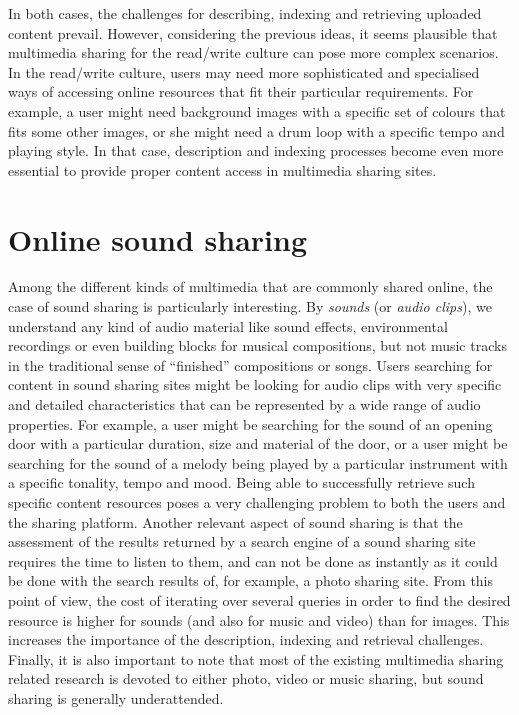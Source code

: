 In both cases, the challenges for describing, indexing and retrieving uploaded content prevail. 
However, considering the previous ideas, it seems plausible that multimedia sharing for the read/write culture can pose more complex scenarios. In the read/write culture, users may need more sophisticated and specialised ways of accessing online resources that fit their particular requirements. For example, a user might need background images with a specific set of colours that fits some other images, or she might need a drum loop with a specific tempo and playing style. In that case, description and indexing processes become even more essential to provide proper content access in multimedia sharing sites.

\section{Online sound sharing}
\label{sec:intro:sound_sharing}

Among the different kinds of multimedia that are commonly shared online, the case of sound sharing is particularly interesting. By \emph{sounds} (or \emph{audio clips}), we understand any kind of audio material like sound effects, environmental recordings or even building blocks for musical compositions, but not music tracks in the traditional sense of ``finished'' compositions or songs.
Users searching for content in sound sharing sites might be looking for audio clips with very specific and detailed characteristics that can be represented by a wide range of audio properties. For example, a user might be searching for the sound of an opening door with a particular duration, size and material of the door, or a user might be searching for the sound of a melody being played by a particular instrument with a specific tonality, tempo and mood. Being able to successfully retrieve such specific content resources poses a very challenging problem to both the users and the sharing platform. 
Another relevant aspect of sound sharing is that the assessment of the results returned by a search engine of a sound sharing site requires the time to listen to them, and can not be done as instantly as it could be done with the search results of, for example, a photo sharing site. %
From this point of view, the cost of iterating over several queries in order to find the desired resource is higher for sounds (and also for music and video) than for images. This increases the importance of the description, indexing and retrieval challenges.
Finally, it is also important to note that most of the existing multimedia sharing related research is devoted to either photo, video or music sharing, but sound sharing is generally underattended.

